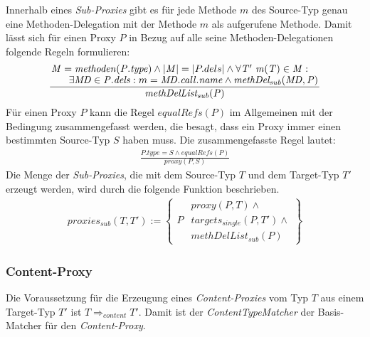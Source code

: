 \documentclass[a4paper,12pt]{article}
\begin{document}
Innerhalb eines \emph{Sub-Proxies} gibt es für jede Methode $m$ des Source-Typ genau eine Methoden-Delegation mit der Methode $m$ als aufgerufene Methode. Damit lässt sich für einen Proxy $P$ in Bezug auf alle seine Methoden-Delegationen folgende Regeln formulieren:
\begin{gather*}
\frac{\splitfrac{\mathit{M} = \mathit{methoden(P.type)}\wedge|\mathit{M}| = |P.dels| \wedge \forall \mathit{T'\text{ }m(T)} \in \mathit{M}:}{\exists \mathit{MD} \in \mathit{P.dels}:m = \mathit{MD.call.name} \wedge \mathit{methDel_{sub}(MD,P)
 }}
}
{\mathit{methDelList_{sub}(P)}}
\end{gather*}
Für einen Proxy $P$ kann die Regel $\mathit{equalRefs(P)}$ im Allgemeinen mit der Bedingung zusammengefasst werden, die besagt, dass ein Proxy immer einen bestimmten Source-Typ $S$ haben muss. Die zusammengefasste Regel lautet:
\begin{gather*}
\frac{\mathit{P.type} = \mathit{S} \wedge \mathit{equalRefs(P)}}{\mathit{proxy(P,S)}}
\end{gather*}
\noindent
Die Menge der \emph{Sub-Proxies}, die mit dem Source-Typ $T$ und dem Target-Typ $T'$ erzeugt werden, wird durch die folgende Funktion beschrieben.
\begin{gather*}
\mathit{proxies_{sub}(T,T')} := 
\left\{\begin{array}{l|l}
		& \mathit{proxy(P,T)}\wedge \mathit{ } \\
	P	& \mathit{targets_{single}(P,T')} \wedge \mathit{ } \\
		& \mathit{methDelList_{sub}(P)}
		 \end{array}
\right\}
\end{gather*}


\subsubsection{Content-Proxy}
Die Voraussetzung für die Erzeugung eines \emph{Content-Proxies} vom Typ $T$ aus einem Target-Typ $T'$ ist $T \Rightarrow_{content} T'$. Damit ist der \emph{ContentTypeMatcher} der Basis-Matcher für den \emph{Content-Proxy}.
\end{document}
